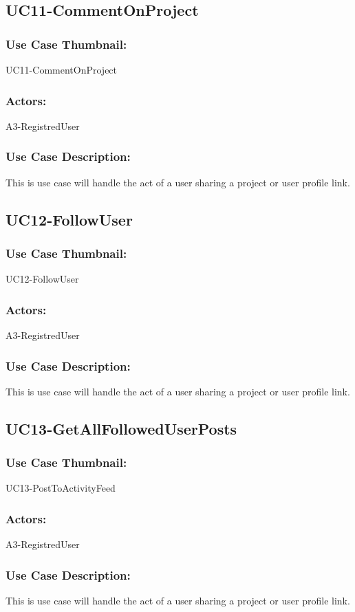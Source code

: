 \documentclass[11pt, openany]{report}
\begin{document}
\subsection{UC11-CommentOnProject}
\label{sUC11}
\subsubsection*{Use Case Thumbnail:}
UC11-CommentOnProject
\subsubsection*{Actors:}
A3-RegistredUser
\subsubsection*{Use Case Description:}
This is use case will handle the act of a user sharing a project or user profile link.


\subsection{UC12-FollowUser}
\label{sUC12}
\subsubsection*{Use Case Thumbnail:}
UC12-FollowUser
\subsubsection*{Actors:}
A3-RegistredUser
\subsubsection*{Use Case Description:}
This is use case will handle the act of a user sharing a project or user profile link.


\subsection{UC13-GetAllFollowedUserPosts}
\label{sUC13}
\subsubsection*{Use Case Thumbnail:}
UC13-PostToActivityFeed
\subsubsection*{Actors:}
A3-RegistredUser
\subsubsection*{Use Case Description:}
This is use case will handle the act of a user sharing a project or user profile link.
\end{document}
